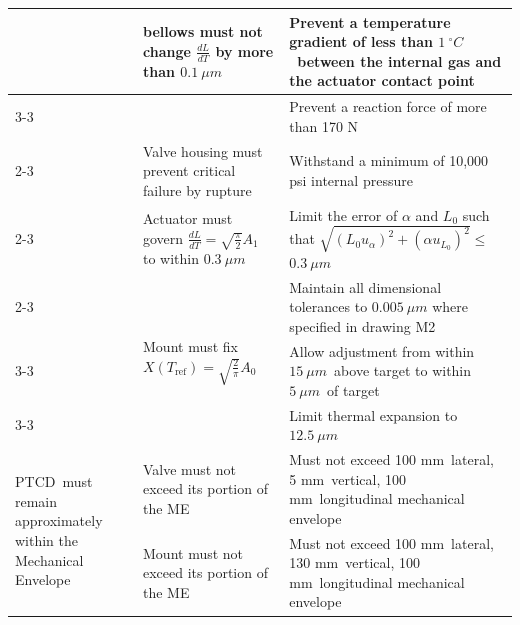 \documentclass[12pt, letterpaper]{report}%
\newcommand{\device}{PTCD}
\newcommand{\degC}{^{\circ}C}    %
\newcommand{\dLdTTolValve}{$0.1\ \mu m$}
\newcommand{\dTTol}{$1\ \degC$}
\newcommand{\FTolValve}{170 N}
\newcommand{\valveMEX}{100 mm}
\newcommand{\valveMEY}{5 mm}
\newcommand{\valveMEZ}{100 mm}
\newcommand{\dLdTTolAct}{$0.3\ \mu m$}
\newcommand{\mountdLTol}{$12.5\ \mu m$}
\newcommand{\calRange}{$15\ \mu m$}
\newcommand{\calTol}{$5\ \mu m$}
\newcommand{\mountMEX}{100 mm}
\newcommand{\mountMEY}{130 mm}
\newcommand{\mountMEZ}{100 mm}
\begin{document}
\begin{appendices}
\begin{table}[H]
\begin{tabular}{|m{}|m{}|m{}|}
            &
        \multirow[c]{2}{0.3\textwidth}{%
            bellows must not change $\frac{dL}{dT}$ by more than \dLdTTolValve\ %
        }
            &
        Prevent a temperature gradient of less than \dTTol\ between the internal gas and the actuator contact point
        \\ \cline{3-3}

            &
            &
        Prevent a reaction force of more than \FTolValve
        \\ \cline{2-3}

        &
        Valve housing must prevent critical failure by rupture
        &
        Withstand a minimum of 10{,}000 psi internal pressure
        \\ \cline{2-3}

            &
        Actuator must govern $\frac{dL}{dT} = \sqrt{\frac{\pi}{2}} A_1$ to within \dLdTTolAct\
            &
        Limit the error of $\alpha$ and $L_0$ such that
        $\sqrt{(L_0 u_\alpha)^2 + (\alpha u_{L_0})^2} \leq $\dLdTTolAct
        \\ \cline{2-3}

            &
        \multirow[c]{3}{0.3\textwidth}{%
            Mount must fix $X(T_{\text{ref}}) = \sqrt{\frac{2}{\pi}} A_0$ %
        }
            &
        Maintain all dimensional tolerances to $0.005\ \mu m$ where specified in drawing M2
        \\ \cline{3-3}

            &
            &
        Allow adjustment from within \calRange\ above target to within \calTol\ of target
        \\ \cline{3-3}

            &
            &
        Limit thermal expansion to \mountdLTol
        \\ \hline

        \multirow[c]{2}{0.2\textwidth}{%
            \device\ must remain approximately within the Mechanical Envelope
        }
            &
        Valve must not exceed its portion of the ME
            &
        Must not exceed \valveMEX\ lateral, \valveMEY\ vertical, \valveMEZ\ longitudinal mechanical envelope
        \\ \cline{2-3}

            &
        Mount must not exceed its portion of the ME
            &
        Must not exceed \mountMEX\ lateral, \mountMEY\ vertical, \mountMEZ\ longitudinal mechanical envelope
        

\end{tabular}
\end{table}
\end{appendices}
\end{document}
